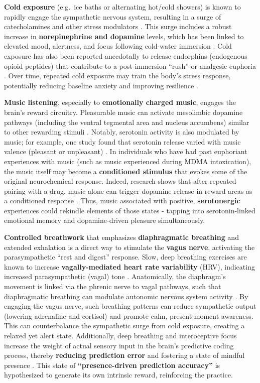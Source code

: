 \documentclass[11pt]{article}
\newcommand{\quotes}[1]{``#1''}
\begin{document}
\textbf{Cold exposure} (e.g.\ ice baths or alternating hot/cold showers) is known to rapidly engage the sympathetic nervous system, resulting in a surge of catecholamines and other stress modulators \cite{Brenner2001,PBS2023}. This surge includes a robust increase in \textbf{\textbf{norepinephrine} and dopamine} levels, which has been linked to elevated mood, alertness, and focus following cold-water immersion \cite{Brenner2001,PBS2023}. Cold exposure has also been reported anecdotally to release endorphins (endogenous opioid peptides) that contribute to a post-immersion \quotes{rush} or analgesic euphoria \cite{PBS2023}. Over time, repeated cold exposure may train the body's stress response, potentially reducing baseline anxiety and improving resilience \cite{PBS2023}.

\textbf{Music listening}, especially to \textbf{emotionally charged music}, engages the brain's reward circuitry. Pleasurable music can activate mesolimbic dopamine pathways (including the ventral tegmental area and nucleus accumbens) similar to other rewarding stimuli \cite{Feduccia2008}. Notably, serotonin activity is also modulated by music; for example, one study found that serotonin release varied with music valence (pleasant or unpleasant) \cite{Dean2023}. In individuals who have had past euphoriant experiences with music (such as music experienced during MDMA intoxication), the music itself may become a \textbf{conditioned stimulus} that evokes some of the original neurochemical response. Indeed, research shows that after repeated pairing with a drug, music alone can trigger dopamine release in reward areas as a conditioned response \cite{Feduccia2008}. Thus, music associated with positive, \textbf{serotonergic} experiences could rekindle elements of those states - tapping into serotonin-linked emotional memory and dopamine-driven pleasure simultaneously.

\textbf{Controlled breathwork} that emphasizes \textbf{diaphragmatic breathing} and extended exhalation is a direct way to stimulate the \textbf{vagus nerve}, activating the parasympathetic \quotes{rest and digest} response. Slow, deep breathing exercises are known to increase \textbf{vagally-mediated heart rate variability} (HRV), indicating increased parasympathetic (vagal) tone \cite{Zaccaro2018,Gerritsen2018}. Anatomically, the diaphragm's movement is linked via the phrenic nerve to vagal pathways, such that diaphragmatic breathing can modulate autonomic nervous system activity \cite{Gerritsen2018}. By engaging the vagus nerve, such breathing patterns can reduce sympathetic output (lowering adrenaline and cortisol) and promote calm, present-moment awareness. This can counterbalance the sympathetic surge from cold exposure, creating a relaxed yet alert state. Additionally, deep breathing and interoceptive focus increase the weight of actual sensory input in the brain's predictive coding process, thereby \textbf{reducing prediction error} and fostering a state of mindful presence \cite{Kirk2015}. This state of \textbf{\quotes{presence-driven prediction accuracy}} is hypothesized to generate its own intrinsic reward, reinforcing the practice.
\end{document}
